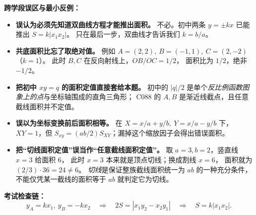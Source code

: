 \begin{trapbox}
\medskip
\textbf{跨学段误区与最小反例：}
\begin{itemize}
\item \textbf{误认为必须先知道双曲线方程才能推出面积。}
不必。初中两条 $y=\pm kx$ 已能推出 $S=k|x_1x_2|$。
只在最后一步，双曲线才告诉我们 $k=b/a$。
\item \textbf{共底面积比忘了取绝对值。}
例如 $A=(2,2),\ B=(-1,1),\ C=(2,-2)$（$k=1$）。
此时 $B,C$ 在反向射线上，$OB/OC=1/2$，
面积比为 $1/2$，绝非 $-1/2$。
\item \textbf{把初中 $xy=q$ 的面积定值直接套给本题。}
初中的 $|q|/2$ 是单个\emph{反比例函数图象上的点}与坐标轴围成的直角三角形；
C088 的 $A,B$ 是渐近线截点，且任意截线面积并不定值。
\item \textbf{误以为坐标变换前后面积相等。}
在 $X=x/a+y/b,\ Y=x/a-y/b$ 下，$XY=1$，但
$S_{xy}=(ab/2)S_{XY}$；漏掉这个缩放因子会得出错误面积。
\item \textbf{把“切线面积定值”误当作“任意截线面积定值”。}
取 $a=3,b=2$，竖直线 $x=3$ 给面积 $6$，
此时 $x=3$ 本来就是顶点切线；换成割线 $x=6$，
面积就为 $(2/3)\cdot36=24\ne6$。
\emph{切线}是保证整族截线面积统一为 $ab$ 的一种充分条件，不能仅凭某一截线的面积等于 $ab$ 就判定它为切线。
\end{itemize}

\textbf{考试检查链：}
\[
\boxed{y_A=kx_1,\ y_B=-kx_2}
\quad\Longrightarrow\quad
\boxed{2S=|x_1y_2-x_2y_1|}
\quad\Longrightarrow\quad
\boxed{S=k|x_1x_2|}.
\]
\end{trapbox}
